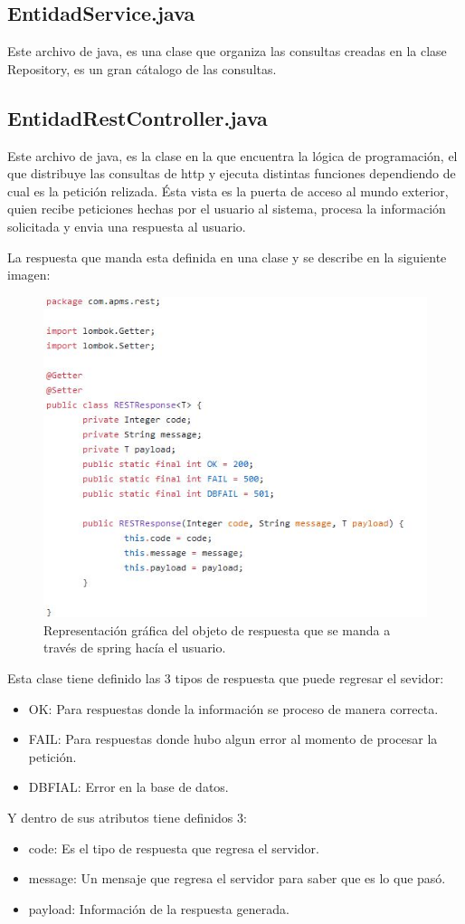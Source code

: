 \subsection{EntidadService.java}
Este archivo de java, es una clase que organiza las consultas creadas en la clase Repository, es un gran cátalogo de las consultas.
\subsection{EntidadRestController.java}
Este archivo de java, es la clase en la que encuentra la lógica de programación, el que distribuye las consultas de http y ejecuta distintas funciones dependiendo de cual es la petición relizada.
Ésta vista es la puerta de acceso al mundo exterior, quien recibe peticiones hechas por el usuario al sistema, procesa la información solicitada y envia una respuesta al usuario.

La respuesta que manda esta definida en una clase y se describe en la siguiente imagen:
\begin{figure}[H]
	\centering
	\includegraphics[width=0.6\linewidth]{images/tecnologias/Response}
	\caption{Representación gráfica del objeto de respuesta que se manda a través de spring hacía el usuario.}
\end{figure}
Esta clase tiene definido las 3 tipos de respuesta que puede regresar el sevidor:
\begin{itemize}
    \item OK: Para respuestas donde la información se proceso de manera correcta.
    \item FAIL: Para respuestas donde hubo algun error al momento de procesar la petición.
    \item DBFIAL: Error en la base de datos.
\end{itemize}
Y dentro de sus atributos tiene definidos 3:
\begin{itemize}
    \item code: Es el tipo de respuesta que regresa el servidor.
    \item message: Un mensaje que regresa el servidor para saber que es lo que pasó.
    \item payload: Información de la respuesta generada.
\end{itemize}

